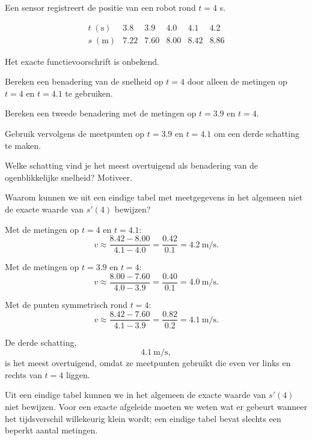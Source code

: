 \documentclass{ximera}
\begin{document}
\begin{oefening}{\oefG}

Een sensor registreert de positie van een robot rond $t=4$ s.

\[
\begin{array}{c|ccccc}
t\;(\mathrm{s})
&3.8&3.9&4.0&4.1&4.2\\ \hline
s\;(\mathrm{m})
&7.22&7.60&8.00&8.42&8.86
\end{array}
\]

Het exacte functievoorschrift is onbekend.

\begin{question}
Bereken een benadering van de snelheid op $t=4$ door alleen de
metingen op $t=4$ en $t=4.1$ te gebruiken.
\end{question}

\begin{question}
Bereken een tweede benadering met de metingen op $t=3.9$ en $t=4$.
\end{question}

\begin{question}
Gebruik vervolgens de meetpunten op $t=3.9$ en $t=4.1$ om een
derde schatting te maken.
\end{question}

\begin{question}
Welke schatting vind je het meest overtuigend als benadering van de
ogenblikkelijke snelheid? Motiveer.
\end{question}

\begin{question}
Waarom kunnen we uit een eindige tabel met meetgegevens in het
algemeen niet de exacte waarde van $s'(4)$ bewijzen?
\end{question}

\begin{oplossing}

Met de metingen op $t=4$ en $t=4.1$:
\[
v
\approx
\frac{8.42-8.00}{4.1-4.0}
=
\frac{0.42}{0.1}
=
4.2\ \mathrm{m/s}.
\]

Met de metingen op $t=3.9$ en $t=4$:
\[
v
\approx
\frac{8.00-7.60}{4.0-3.9}
=
\frac{0.40}{0.1}
=
4.0\ \mathrm{m/s}.
\]

Met de punten symmetrisch rond $t=4$:
\[
v
\approx
\frac{8.42-7.60}{4.1-3.9}
=
\frac{0.82}{0.2}
=
4.1\ \mathrm{m/s}.
\]

De derde schatting,
\[
\boxed{4.1\ \mathrm{m/s}},
\]
is het meest overtuigend, omdat ze meetpunten gebruikt die even ver
links en rechts van $t=4$ liggen.

Uit een eindige tabel kunnen we in het algemeen de exacte waarde van
$s'(4)$ niet bewijzen. Voor een exacte afgeleide moeten we weten wat er
gebeurt wanneer het tijdsverschil willekeurig klein wordt; een eindige
tabel bevat slechts een beperkt aantal metingen.

\end{oplossing}

\end{oefening}
\end{document}
